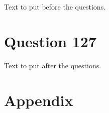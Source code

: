 \documentclass[11pt]{article}
\begin{document}
Text to put before the questions.


\section{Question 127}





Text to put after the questions.


\section{Appendix}

\end{document}
